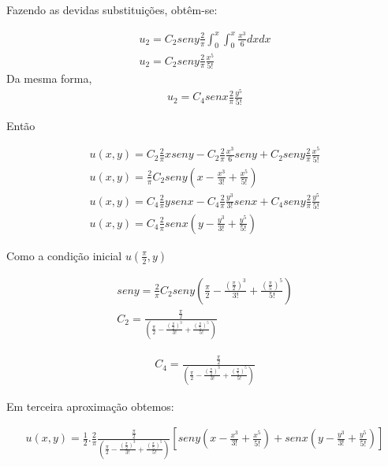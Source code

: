 Fazendo as devidas substituições, obtêm-se:

\begin{gather}
u_{2} = C_{2}seny\frac{2}{\pi}\int_0^x \int_0^x \frac{x^3}{6}dxdx\nonumber\\
u_{2} = C_{2}seny\frac{2}{\pi}\frac{x^5}{5!}
\end{gather}
Da mesma forma,
\begin{gather}
u_{2} = C_{4}senx\frac{2}{\pi}\frac{y^5}{5!}
\end{gather}

Então



\begin{gather}
u(x,y) = C_{2}\frac{2}{\pi}xseny - C_{2}\frac{2}{\pi}\frac{x^3}{6}seny + C_{2}seny\frac{2}{\pi}\frac{x^5}{5!}\nonumber\\
u(x,y) = \frac{2}{\pi}C_{2}seny\left(x - \frac{x^3}{3!} + \frac{x^5}{5!}\right)\nonumber\\
u(x,y) = C_{4}\frac{2}{\pi}ysenx - C_{4}\frac{2}{\pi}\frac{y^3}{3!}senx + C_{4}seny\frac{2}{\pi}\frac{y^5}{5!}\nonumber\\
u(x,y) = C_{4}\frac{2}{\pi}senx\left(y - \frac{y^3}{3!} + \frac{y^5}{5!}\right)
\end{gather}

Como a condição inicial $u\left(\frac{\pi}{2},y\right)$

\begin{gather}
seny = \frac{2}{\pi}C_{2}seny\left(\frac{\pi}{2}-\frac{(\frac{\pi}{2})^3}{3!} + \frac{(\frac{\pi}{5})^5}{5!}\right)\nonumber\\
C_{2} = \frac{\frac{\pi}{2}}{\left(\frac{\pi}{2}-\frac{(\frac{\pi}{2})^3}{3!} + \frac{(\frac{\pi}{5})^5}{5!}\right)}
\end{gather}

\begin{gather}
C_{4} = \frac{\frac{\pi}{2}}{\left(\frac{\pi}{2}-\frac{(\frac{\pi}{2})^3}{3!} + \frac{(\frac{\pi}{5})^5}{5!}\right)}
\end{gather}


Em terceira aproximação obtemos:


\begin{gather}
u(x,y) = \frac{1}{2}.\frac{2}{\pi}\frac{\frac{\pi}{2}}{\left(\frac{\pi}{2}-\frac{(\frac{\pi}{2})^3}{3!} + \frac{(\frac{\pi}{5})^5}{5!}\right)}\left[seny\left(x - \frac{x^3}{3!} + \frac{x^5}{5!}\right) + senx\left( y - \frac{y^3}{3!} + \frac{y^5}{5!}\right)\right]
\end{gather}

